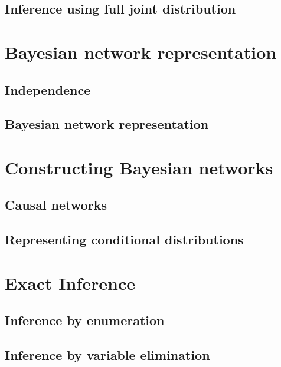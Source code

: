 \documentclass[12pt,a4paper,twoside]{book}
\begin{document}
\section{Inference using full joint distribution}

\label{s_1_2}

\chapter{Bayesian network representation}

\label{c_2}

\section{Independence}

\label{s_2_1}

\section{Bayesian network representation}

\label{s_2_2}

\chapter{Constructing Bayesian networks}

\label{c_3}

\section{Causal networks}

\label{s_3_1}

\section{Representing conditional distributions}

\label{s_3_2}

\chapter{Exact Inference}

\label{c_4}

\section{Inference by enumeration}

\label{s_4_1}

\section{Inference by variable elimination}

\label{s_4_2}
\end{document}

